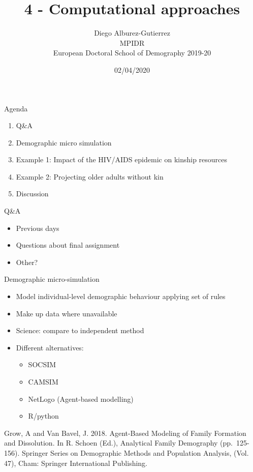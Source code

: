 \documentclass[
  ignorenonframetext,
]{beamer}
\title{4 - Computational approaches}
\author{Diego Alburez-Gutierrez\\
MPIDR\\
European Doctoral School of Demography 2019-20}
\date{02/04/2020}
\providecommand{\tightlist}{%
  \setlength{\itemsep}{0pt}\setlength{\parskip}{0pt}}
\begin{document}
\frame{\titlepage}

\begin{frame}{Agenda}
\protect\hypertarget{agenda}{}

\begin{enumerate}
\tightlist
\item
  Q\&A
\item
  Demographic micro simulation
\item
  Example 1: Impact of the HIV/AIDS epidemic on kinship resources
\item
  Example 2: Projecting older adults without kin
\item
  Discussion
\end{enumerate}

\end{frame}

\begin{frame}{Q\&A}
\protect\hypertarget{qa}{}

\begin{itemize}
\tightlist
\item
  Previous days
\item
  Questions about final assignment
\item
  Other?
\end{itemize}

\end{frame}

\begin{frame}{Demographic micro-simulation}
\protect\hypertarget{demographic-micro-simulation}{}

\begin{itemize}
\tightlist
\item
  Model individual-level demographic behaviour applying set of rules
\item
  Make up data where unavailable
\item
  Science: compare to independent method
\item
  Different alternatives:

  \begin{itemize}
  \tightlist
  \item
    SOCSIM
  \item
    CAMSIM
  \item
    NetLogo (Agent-based modelling)
  \item
    R/python
  \end{itemize}
\end{itemize}

\tiny Grow, A and Van Bavel, J. 2018. Agent-Based Modeling of Family
Formation and Dissolution. In R. Schoen (Ed.), Analytical Family
Demography (pp.~125-156). Springer Series on Demographic Methods and
Population Analysis, (Vol. 47), Cham: Springer International Publishing.

\end{frame}
\end{document}
